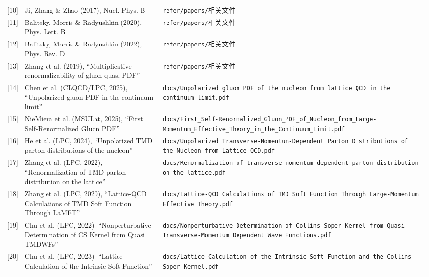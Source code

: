 \documentclass[12pt,a4paper]{ctexart}
\theoremstyle{definition}
\begin{document}
\begin{longtable}{lp{6cm}p{5cm}}
[10] & Ji, Zhang \& Zhao (2017), Nucl. Phys. B & \texttt{refer/papers/}相关文件 \\

[11] & Balitsky, Morris \& Radyushkin (2020), Phys. Lett. B & \texttt{refer/papers/}相关文件 \\

[12] & Balitsky, Morris \& Radyushkin (2022), Phys. Rev. D & \texttt{refer/papers/}相关文件 \\

[13] & Zhang et al. (2019), ``Multiplicative renormalizability of gluon quasi-PDF'' & \texttt{refer/papers/}相关文件 \\

[14] & Chen et al. (CLQCD/LPC, 2025), ``Unpolarized gluon PDF in the continuum limit'' & \texttt{docs/Unpolarized gluon PDF of the nucleon from lattice QCD in the continuum limit.pdf} \\

[15] & NieMiera et al. (MSULat, 2025), ``First Self-Renormalized Gluon PDF'' & \texttt{docs/First\_Self-Renormalized\_Gluon\_PDF\_of\_Nucleon\_from\_Large-Momentum\_Effective\_Theory\_in\_the\_Continuum\_Limit.pdf} \\

[16] & He et al. (LPC, 2024), ``Unpolarized TMD parton distributions of the nucleon'' & \texttt{docs/Unpolarized Transverse-Momentum-Dependent Parton Distributions of the Nucleon from Lattice QCD.pdf} \\

[17] & Zhang et al. (LPC, 2022), ``Renormalization of TMD parton distribution on the lattice'' & \texttt{docs/Renormalization of transverse-momentum-dependent parton distribution on the lattice.pdf} \\

[18] & Zhang et al. (LPC, 2020), ``Lattice-QCD Calculations of TMD Soft Function Through LaMET'' & \texttt{docs/Lattice-QCD Calculations of TMD Soft Function Through Large-Momentum Effective Theory.pdf} \\

[19] & Chu et al. (LPC, 2022), ``Nonperturbative Determination of CS Kernel from Quasi TMDWFs'' & \texttt{docs/Nonperturbative Determination of Collins-Soper Kernel from Quasi Transverse-Momentum Dependent Wave Functions.pdf} \\

[20] & Chu et al. (LPC, 2023), ``Lattice Calculation of the Intrinsic Soft Function'' & \texttt{docs/Lattice Calculation of the Intrinsic Soft Function and the Collins-Soper Kernel.pdf} \\


\end{longtable}
\end{document}
